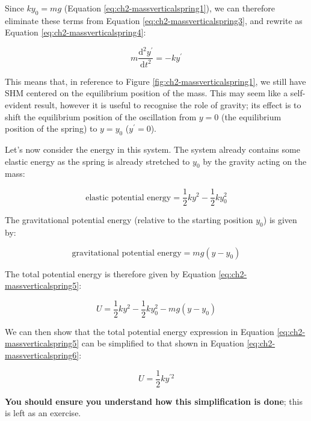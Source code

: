\documentclass[
]{book}
\begin{document}
Since \(ky_0 = mg\) (Equation \eqref{eq:ch2-massverticalspring1}), we can therefore eliminate these terms from Equation \eqref{eq:ch2-massverticalspring3}, and rewrite as Equation \eqref{eq:ch2-massverticalspring4}:

\begin{equation}
m\dfrac{\mathrm{d}^2 y^\prime}{\mathrm{d} t^2} = -k y^\prime
\label{eq:ch2-massverticalspring4}
\end{equation}

This means that, in reference to Figure \ref{fig:ch2-massverticalspring1}, we still have SHM centered on the equilibrium position of the mass. This may seem like a self-evident result, however it is useful to recognise the role of gravity; its effect is to shift the equilibrium position of the oscillation from \(y = 0\) (the equilibrium position of the spring) to \(y = y_0\) (\(y^\prime = 0\)).

Let's now consider the energy in this system. The system already contains some elastic energy as the spring is already stretched to \(y_0\) by the gravity acting on the mass:

\begin{equation}
\textrm{elastic potential energy} = \frac{1}{2}ky^2 - \frac{1}{2}ky_0^2
\end{equation}

The gravitational potential energy (relative to the starting position \(y_0\)) is given by:

\begin{equation}
\textrm{gravitational potential energy} = mg(y-y_0)
\end{equation}

The total potential energy is therefore given by Equation \eqref{eq:ch2-massverticalspring5}:

\begin{equation}
U = \frac{1}{2}ky^2 - \frac{1}{2}ky_0^2 - mg(y-y_0)
\label{eq:ch2-massverticalspring5}
\end{equation}

We can then show that the total potential energy expression in Equation \eqref{eq:ch2-massverticalspring5} can be simplified to that shown in Equation \eqref{eq:ch2-massverticalspring6}:

\begin{equation}
U = \frac{1}{2} ky^{\prime 2}
\label{eq:ch2-massverticalspring6}
\end{equation}

\textbf{You should ensure you understand how this simplification is done}; this is left as an exercise.
\end{document}
